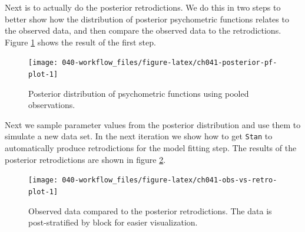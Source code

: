 \documentclass[11pt, oneside, openany]{scrbook}
\newenvironment{Shaded}{\begin{snugshade}}{\end{snugshade}}
\newcommand{\DataTypeTok}[1]{\textcolor[rgb]{0.13,0.29,0.53}{#1}}
\newcommand{\KeywordTok}[1]{\textcolor[rgb]{0.13,0.29,0.53}{\textbf{#1}}}
\newcommand{\NormalTok}[1]{#1}
\newcommand{\OperatorTok}[1]{\textcolor[rgb]{0.81,0.36,0.00}{\textbf{#1}}}
\newcommand{\OtherTok}[1]{\textcolor[rgb]{0.56,0.35,0.01}{#1}}
\newcommand{\StringTok}[1]{\textcolor[rgb]{0.31,0.60,0.02}{#1}}
\begin{document}
Next is to actually do the posterior retrodictions. We do this in two steps to better show how the distribution of posterior psychometric functions relates to the observed data, and then compare the observed data to the retrodictions. Figure \ref{fig:ch041-posterior-pf-plot} shows the result of the first step.

\begin{figure}

{\centering \texttt{[image: 040-workflow\_files/figure-latex/ch041-posterior-pf-plot-1]} 

}

\caption{Posterior distribution of psychometric functions using pooled observations.}\label{fig:ch041-posterior-pf-plot}
\end{figure}

Next we sample parameter values from the posterior distribution and use them to simulate a new data set. In the next iteration we show how to get \texttt{Stan} to automatically produce retrodictions for the model fitting step. The results of the posterior retrodictions are shown in figure \ref{fig:ch041-obs-vs-retro-plot}.

\begin{Shaded}
\end{Shaded}

\begin{figure}

{\centering \texttt{[image: 040-workflow\_files/figure-latex/ch041-obs-vs-retro-plot-1]} 

}

\caption{Observed data compared to the posterior retrodictions. The data is post-stratified by block for easier visualization.}\label{fig:ch041-obs-vs-retro-plot}
\end{figure}
\end{document}
